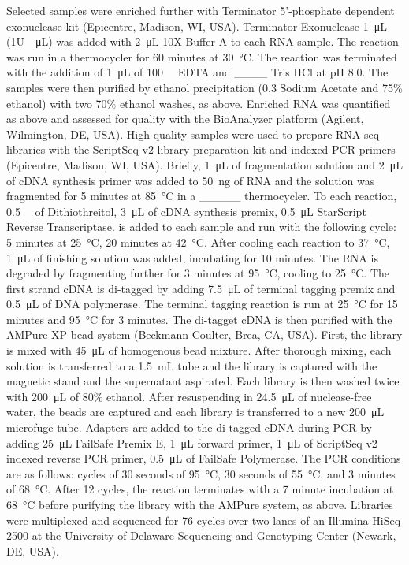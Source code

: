 Selected samples were enriched further with Terminator 5'-phosphate dependent exonuclease kit (Epicentre, Madison, WI, USA). Terminator Exonuclease \SI{1}{\micro\liter} (1U\SI{}{\per\micro\liter}) was added with \SI{2}{\micro\liter} 10X Buffer A to each RNA sample. The reaction was run in a      thermocycler for 60 minutes at \SI{30}{\degreeCelsius}. The reaction was terminated with the addition of \SI{1}{\micro\liter} of \SI{100}{\milli\Molar} EDTA and ____ Tris HCl at pH 8.0. The samples were then purified by ethanol precipitation (\SI{0.3}{\Molar} Sodium Acetate and 75\% ethanol) with two 70\% ethanol washes, as above.
Enriched RNA was quantified as above and assessed for quality with the BioAnalyzer platform (Agilent, Wilmington, DE, USA). High quality samples were used to prepare RNA-seq libraries with the ScriptSeq v2 library preparation kit and indexed PCR primers (Epicentre, Madison, WI, USA). Briefly,  \SI{1}{\micro\liter} of fragmentation solution and \SI{2}{\micro\liter} of cDNA synthesis primer was added to \SI{50}{\nano\gram} of RNA and the solution was fragmented for 5 minutes at \SI{85}{\degreeCelsius} in a _____ thermocycler. To each reaction, \SI{0.5}{\milli\Molar} of Dithiothreitol, \SI{3}{\micro\liter} of cDNA synthesis premix, \SI{0.5}{\micro\liter} StarScript Reverse Transcriptase. is added to each sample and run with the following cycle: 5 minutes at \SI{25}{\degreeCelsius}, 20 minutes at \SI{42}{\degreeCelsius}. After cooling each reaction to \SI{37}{\degreeCelsius}, \SI{1}{\micro\liter} of finishing solution was added, incubating for 10 minutes. The RNA is degraded by fragmenting further for 3 minutes at \SI{95}{\degreeCelsius}, cooling to \SI{25}{\degreeCelsius}. The first strand cDNA is di-tagged by adding \SI{7.5}{\micro\liter} of terminal tagging premix and \SI{0.5}{\micro\liter} of DNA polymerase. The terminal tagging reaction is run at \SI{25}{\degreeCelsius} for 15 minutes and \SI{95}{\degreeCelsius} for 3 minutes. The di-tagget cDNA is then purified with the AMPure XP bead system (Beckmann Coulter, Brea, CA, USA). First, the library is mixed with \SI{45}{\micro\liter} of homogenous bead mixture. After thorough mixing, each solution is transferred to a \SI{1.5}{\milli\liter} tube and the library is captured with the magnetic stand and the supernatant aspirated. Each library is then washed twice with \SI{200}{\micro\liter} of 80\% ethanol. After resuspending in \SI{24.5}{\micro\liter} of nuclease-free water, the beads are captured and each library is transferred to a new \SI{200}{\micro\liter} microfuge tube. Adapters are added to the di-tagged cDNA during PCR by adding \SI{25}{\micro\liter} FailSafe Premix E, \SI{1}{\micro\liter} forward primer, \SI{1}{\micro\liter} of ScriptSeq v2 indexed reverse PCR primer, \SI{0.5}{\micro\liter} of FailSafe Polymerase. The PCR conditions are as follows: cycles of 30 seconds of \SI{95}{\degreeCelsius}, 30 seconds of \SI{55}{\degreeCelsius}, and 3 minutes of \SI{68}{\degreeCelsius}. After 12 cycles, the reaction terminates with a 7 minute incubation at \SI{68}{\degreeCelsius} before purifying the library with the AMPure system, as above.  Libraries were multiplexed and sequenced for 76 cycles over two lanes of an Illumina HiSeq 2500 at the University of Delaware Sequencing and Genotyping Center (Newark, DE, USA).
